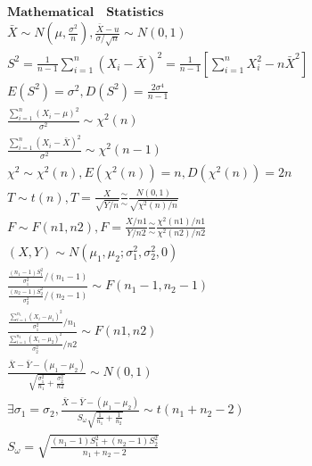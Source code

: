 \documentclass{article}
\begin{document}
\clearpage
\begin{align*}
    \bm{Mathematical \quad Statistics} \\ 
    \bar{X} \sim N(\mu,\frac{\sigma^2}{n}), \frac{\bar{X}-u}{\sigma/\sqrt{n}} \sim N(0,1)\\ 
    S^2 = \frac{1}{n-1}\sum_{i=1}^n(X_{i}-\bar{X})^2 = \frac{1}{n-1}[\sum_{i=1}^nX_{i}^2 - n \bar{X}^2] \\ 
    E(S^2) = \sigma^2, D(S^2) = \frac{2\sigma^4}{n-1} \\ 
    \frac{\sum_{i=1}^n(X_{i}-\mu)^2}{\sigma^2} \sim \chi^2(n) \\ 
    \frac{\sum_{i=1}^n(X_{i}-\bar{X})^2}{\sigma^2} \sim \chi^2(n-1) \\ 
    \chi^2 \sim \chi^2(n), E(\chi^2(n)) = n, D(\chi^2(n)) = 2n \\ 
    T \sim t(n), T = \frac{X}{\sqrt{Y/n}} \frac{\sim}{\sim} \frac{N(0,1)}{\sqrt{\chi^2(n)/n}}\\
    F \sim F(n1,n2), F = \frac{X/n1}{Y/n2} \frac{\sim}{\sim} \frac{\chi^2(n1)/n1}{\chi^2(n2)/n2} \\ 
    (X,Y) \sim N(\mu_{1},\mu_{2};\sigma_{1}^2,\sigma_{2}^2,0) \\ 
    \frac{\frac{(n_{1}-1)S_{1}^2}{\sigma_{1}^2}/(n_{1}-1)}{\frac{(n_{2}-1)S_{2}^2}{\sigma_{2}^2}/(n_{2}-1)} \sim F(n_{1}-1,n_{2}-1) \\
    \frac{\frac{\sum_{i=1}^{n_{1}}(X_{i}-\mu_{1})^2}{\sigma_{1}^2}/n_{1}}{\frac{\sum_{i=1}^{n_{2}}(X_{i}-\mu_{2})^2}{\sigma_{2}^2}/n2} \sim F(n1,n2) \\  
    \frac{\bar{X}-\bar{Y}-(\mu_{1}-\mu_{2})}{\sqrt{\frac{\sigma_{1}^2}{n_{1}}+\frac{\sigma_{2}^2}{n2}}} \sim N(0,1) \\ 
    \exists \sigma_{1} = \sigma_{2}, \frac{\bar{X}-\bar{Y}-(\mu_{1}-\mu_{2})}{S_{\omega}\sqrt{\frac{1}{n_{1}}+\frac{1}{n_{2}}}} \sim t(n_{1}+n_{2}-2) \\ 
    S_{\omega} = \sqrt{\frac{(n_{1}-1)S_{1}^2+(n_{2}-1)S_{2}^2 }{n_{1}+n_{2}-2}}
\end{align*}

\clearpage
\end{document}
